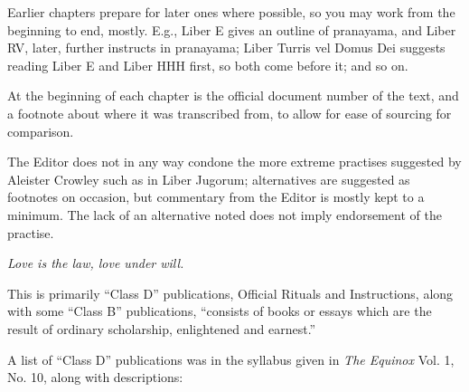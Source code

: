 Earlier chapters prepare for later ones where possible, so you may work from the beginning to end, mostly. E.g., Liber E gives an outline of pranayama, and Liber RV, later, further instructs in pranayama; Liber Turris vel Domus Dei suggests reading Liber E and Liber HHH first, so both come before it; and so on.

At the beginning of each chapter is the official document number of the text, and a footnote about where it was transcribed from, to allow for ease of sourcing for comparison.

The Editor does not in any way condone the more extreme practises suggested by Aleister Crowley such as in Liber Jugorum; alternatives are suggested as footnotes on occasion, but commentary from the Editor is mostly kept to a minimum. The lack of an alternative noted does not imply endorsement of the practise.

\textit{Love is the law, love under will.}




This is primarily \enquote{Class D} publications, Official Rituals and Instructions, along with some \enquote{Class B} publications, \enquote{consists of books or essays which are the result of ordinary scholarship, enlightened and earnest.}

A list of \enquote{Class D} publications was in the syllabus given in \textit{The Equinox} Vol. 1, No. 10, along with descriptions:

